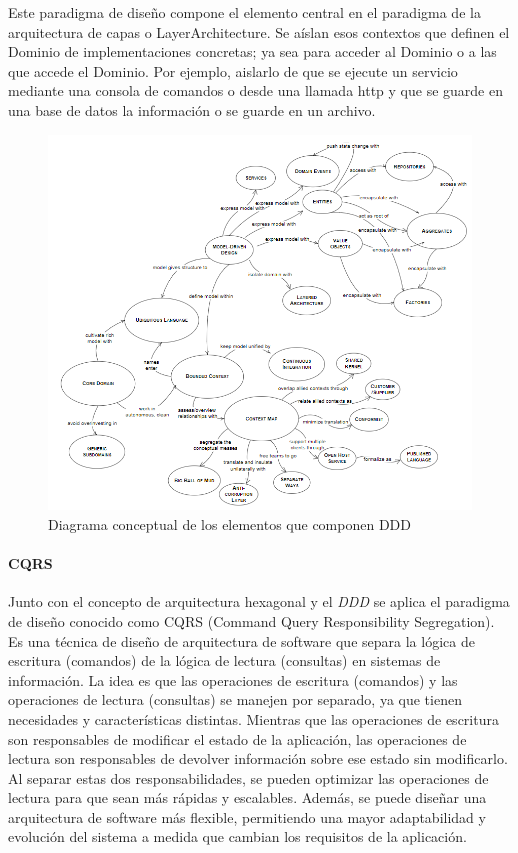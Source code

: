 Este paradigma de diseño compone el elemento central en el paradigma de la arquitectura de capas o \gls{LayerArchitecture}.
Se aíslan esos contextos que definen el Dominio de implementaciones concretas;
ya sea para acceder al Dominio o a las que accede el Dominio.
Por ejemplo, aislarlo de que se ejecute un servicio mediante una consola de comandos o desde una llamada http y que se guarde en una base de datos la información o se guarde en un archivo.

\begin{figure}[H]
    \centering
    \includegraphics[height=0.6\textheight]{./part/Proyecto_ejecutivo/memoria_descriptiva/infoPreviaAntecedentes/img/DomainDrivenDesignReference}
    \caption{Diagrama conceptual de los elementos que componen DDD\cite{EricEvans2003DDTC}}\label{fig:DomainDrivenDesignReference}
\end{figure}

\paragraph{CQRS}

Junto con el concepto de arquitectura hexagonal y el \textit{DDD} se aplica el paradigma de diseño conocido como \gls{CQRS} (Command Query Responsibility Segregation).
Es una técnica de diseño de arquitectura de software que separa la lógica de escritura (comandos) de la lógica de lectura (consultas) en sistemas de información.
La idea es que las operaciones de escritura (comandos) y las operaciones de lectura (consultas) se manejen por separado, ya que tienen necesidades y características distintas.
Mientras que las operaciones de escritura son responsables de modificar el estado de la aplicación, las operaciones de lectura son responsables de devolver información sobre ese estado sin modificarlo.
Al separar estas dos responsabilidades, se pueden optimizar las operaciones de lectura para que sean más rápidas y escalables.
Además, se puede diseñar una arquitectura de software más flexible, permitiendo una mayor adaptabilidad y evolución del sistema a medida que cambian los requisitos de la aplicación.

